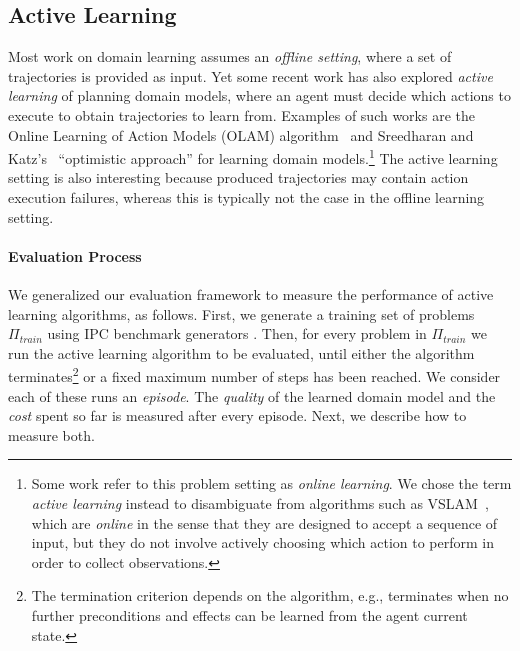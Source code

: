 \documentclass[letterpaper]{article} %
\newcommand{\ptrain}{\ensuremath{\Pi_{\textit{train}}}\xspace}
\begin{document}
\subsection{Active Learning}
Most work on domain learning assumes an \emph{offline setting}, where a set of trajectories is provided as input. Yet some recent work has also explored \emph{active learning} of planning domain models, where an agent must decide which actions to execute to obtain trajectories to learn from. 
Examples of such works are the Online Learning of Action Models (OLAM) algorithm~\cite{lamanna2021online} and 
Sreedharan and Katz's~ ``optimistic approach'' for learning domain models.\footnote{Some work refer to this problem setting as \emph{online learning}. We chose the term \emph{active learning} instead to disambiguate from algorithms such as VSLAM~\cite{aineto2024action}, which are \emph{online} in the sense that they are designed to accept a sequence of input, but they do not involve actively choosing which action to perform in order to collect observations.}
The active learning setting is also interesting because produced trajectories may contain action execution failures, whereas this is typically not the case in the offline learning setting.  


\paragraph{Evaluation Process}
We generalized our evaluation framework to measure the performance of active learning algorithms, as follows. 
First, we generate a training set of problems $\ptrain$ using IPC benchmark generators \citep{seipp-et-al-zenodo2022}.
Then, for every problem in $\ptrain$ we run the active learning algorithm to be evaluated, until either the algorithm terminates\footnote{The termination criterion depends on the algorithm, e.g., \cite{lamanna2021online} terminates when no further preconditions and effects can be learned from the agent current state.} or a fixed maximum number of steps has been reached. We consider each of these runs an \emph{episode}.
The \emph{quality} of the learned domain model and the \emph{cost} spent so far is measured after every episode. Next, we describe how to measure both. 

\end{document}
